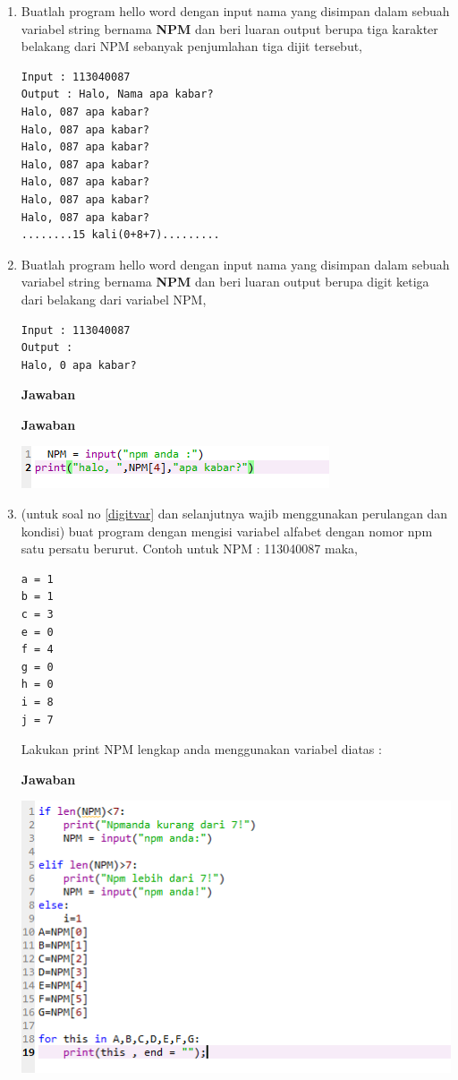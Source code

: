 \begin{enumerate}
\item
Buatlah program hello word dengan input nama yang disimpan dalam sebuah variabel string bernama \textbf{NPM} dan beri luaran output berupa tiga karakter belakang dari NPM sebanyak penjumlahan tiga dijit tersebut, 
\begin{verbatim}
Input : 113040087
Output : Halo, Nama apa kabar? 
Halo, 087 apa kabar?
Halo, 087 apa kabar?
Halo, 087 apa kabar?
Halo, 087 apa kabar?
Halo, 087 apa kabar?
Halo, 087 apa kabar?
Halo, 087 apa kabar?
........15 kali(0+8+7).........
\end{verbatim}
\item
Buatlah program hello word dengan input nama yang disimpan dalam sebuah variabel string bernama \textbf{NPM} dan beri luaran output berupa digit ketiga dari belakang dari variabel NPM, 
\begin{verbatim}
Input : 113040087
Output :
Halo, 0 apa kabar?
\end{verbatim}
\par\textbf{Jawaban}
\par\textbf{Jawaban} 
    \begin{center}
        \centering
        \includegraphics[scale=1.5]{figures/chapter 2/16.PNG}
    \end{center}
\item
\label{digitvar}
(untuk soal no \ref{digitvar} dan selanjutnya wajib menggunakan perulangan dan kondisi) buat program dengan mengisi variabel alfabet dengan nomor npm satu persatu berurut.
Contoh untuk NPM : 113040087 maka,
\begin{verbatim}
a = 1
b = 1
c = 3
e = 0
f = 4
g = 0
h = 0
i = 8
j = 7
\end{verbatim}
Lakukan print NPM lengkap anda menggunakan variabel diatas :
\par\textbf{Jawaban}
    \begin{center}
        \centering
        \includegraphics[scale=1.5]{figures/chapter 2/17.PNG}

\end{center}
\end{enumerate}
